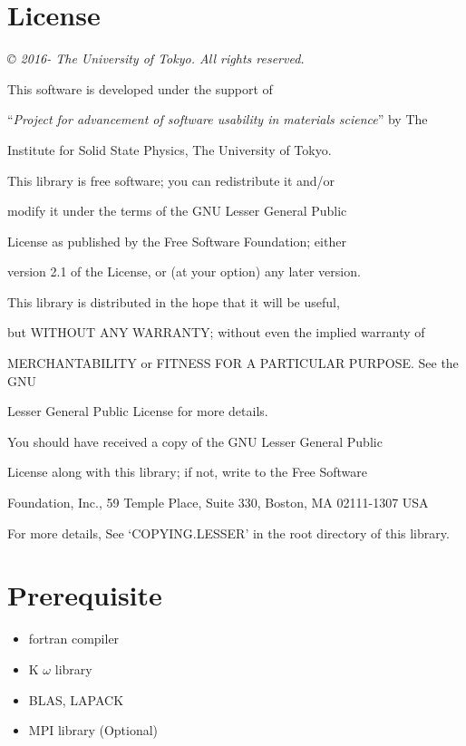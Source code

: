 \documentclass[letterpaper,10pt,dvipdfmx,openany]{sphinxmanual}
\begin{document}
\chapter{License}
\label{shiftk_copy_en::doc}\label{shiftk_copy_en:license}
\emph{© 2016- The University of Tokyo. All rights reserved.}

\begin{DUlineblock}{0em}
\item[] This software is developed under the support of
\item[] ``\emph{Project for advancement of software usability in materials science}'' by The
\item[] Institute for Solid State Physics, The University of Tokyo.
\item[] 
\item[] This library is free software; you can redistribute it and/or
\item[] modify it under the terms of the GNU Lesser General Public
\item[] License as published by the Free Software Foundation; either
\item[] version 2.1 of the License, or (at your option) any later version.
\item[] This library is distributed in the hope that it will be useful,
\item[] but WITHOUT ANY WARRANTY; without even the implied warranty of
\item[] MERCHANTABILITY or FITNESS FOR A PARTICULAR PURPOSE. See the GNU
\item[] Lesser General Public License for more details.
\item[] 
\item[] You should have received a copy of the GNU Lesser General Public
\item[] License along with this library; if not, write to the Free Software
\item[] Foundation, Inc., 59 Temple Place, Suite 330, Boston, MA 02111-1307 USA
\item[] 
\item[] For more details, See ‘COPYING.LESSER’ in the root directory of this library.
\end{DUlineblock}


\chapter{Prerequisite}
\label{shiftk_env_en::doc}\label{shiftk_env_en:prerequisite}\begin{itemize}
\item {} 
fortran compiler

\item {} 
K \(\omega\) library

\item {} 
BLAS, LAPACK

\item {} 
MPI library (Optional)

\end{itemize}
\end{document}
